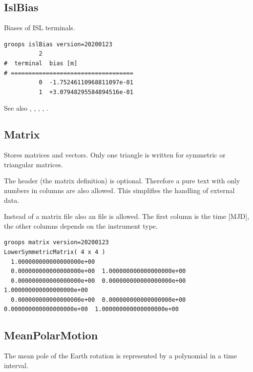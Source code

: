 \subsection{IslBias}\label{general.fileFormat:islBias}
Biases of ISL terminals.

\begin{verbatim}
groops islBias version=20200123
          2
#  terminal  bias [m]
# ===================================
          0  -1.75246110968811097e-01
          1  +3.07948295584894516e-01
 \end{verbatim}

See also , , , , .


\subsection{Matrix}\label{general.fileFormat:matrix}
Stores matrices and vectors. Only one triangle is written for symmetric or triangular matrices.

The header (the matrix definition) is optional.
Therefore a pure text with only numbers in columns are also allowed.
This simplifies the handling of external data.

Instead of a matrix file also an  file is allowed.
The first column is the time [MJD], the other columns depends on the instrument type.

\begin{verbatim}
groops matrix version=20200123
LowerSymmetricMatrix( 4 x 4 )
  1.000000000000000000e+00
  0.000000000000000000e+00  1.000000000000000000e+00
  0.000000000000000000e+00  0.000000000000000000e+00  1.000000000000000000e+00
  0.000000000000000000e+00  0.000000000000000000e+00  0.000000000000000000e+00  1.000000000000000000e+00
\end{verbatim}



\subsection{MeanPolarMotion}\label{general.fileFormat:meanPolarMotion}
The mean pole of the Earth rotation is represented by a polynomial in a time interval.


